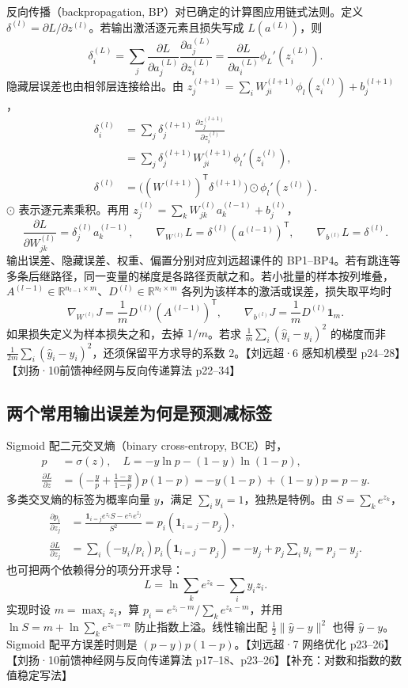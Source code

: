\documentclass[UTF8,a4paper,zihao=-4,fontset=fandol]{ctexrep}
\begin{document}
反向传播（backpropagation, BP）对已确定的计算图应用链式法则。定义 $\delta^{(l)}=\partial L/\partial z^{(l)}$。若输出激活逐元素且损失写成 $L(a^{(L)})$，则
\[
 \delta^{(L)}_i
 =\sum_j\frac{\partial L}{\partial a^{(L)}_j}
       \frac{\partial a^{(L)}_j}{\partial z^{(L)}_i}
 =\frac{\partial L}{\partial a^{(L)}_i}\phi_L'(z^{(L)}_i).
\]
隐藏层误差也由相邻层连接给出。由 $z_j^{(l+1)}=\sum_i W^{(l+1)}_{ji}\phi_l(z^{(l)}_i)+b_j^{(l+1)}$，
\begin{align*}
 \delta^{(l)}_i
 &=\sum_j \delta^{(l+1)}_j\,
    \frac{\partial z_j^{(l+1)}}{\partial z_i^{(l)}}\\
 &=\sum_j \delta^{(l+1)}_j W_{ji}^{(l+1)}\phi_l'(z_i^{(l)}),\\
 \delta^{(l)}
 &=\bigl((W^{(l+1)})^{\mathsf T}\delta^{(l+1)}\bigr)
       \odot\phi_l'(z^{(l)}).
\end{align*}
$\odot$ 表示逐元素乘积。再用 $z^{(l)}_j=\sum_k W^{(l)}_{jk}a_k^{(l-1)}+b_j^{(l)}$，
\[
 \frac{\partial L}{\partial W^{(l)}_{jk}}
 =\delta^{(l)}_j a_k^{(l-1)},\qquad
 \nabla_{W^{(l)}}L=\delta^{(l)}(a^{(l-1)})^{\mathsf T},\qquad
 \nabla_{b^{(l)}}L=\delta^{(l)}.
\]
输出误差、隐藏误差、权重、偏置分别对应刘远超课件的 BP1--BP4。若有跳连等多条后继路径，同一变量的梯度是各路径贡献之和。若小批量的样本按列堆叠，$A^{(l-1)}\in\mathbb R^{n_{l-1}\times m}$、$D^{(l)}\in\mathbb R^{n_l\times m}$ 各列为该样本的激活或误差，损失取平均时
\[
 \nabla_{W^{(l)}}J=\frac1mD^{(l)}(A^{(l-1)})^{\mathsf T},
 \qquad
 \nabla_{b^{(l)}}J=\frac1mD^{(l)}\mathbf 1_m .
\]
如果损失定义为样本损失之和，去掉 $1/m$。若求 $\frac1m\sum_i(\hat y_i-y_i)^2$ 的梯度而非 $\frac1{2m}\sum_i(\hat y_i-y_i)^2$，还须保留平方求导的系数 $2$。【刘远超·6 感知机模型 p24--28】【刘扬·10前馈神经网与反向传递算法 p22--34】

\subsection*{两个常用输出误差为何是预测减标签}

Sigmoid 配二元交叉熵（binary cross-entropy, BCE）时，
\begin{align*}
 p&=\sigma(z),\quad L=-y\ln p-(1-y)\ln(1-p),\\
 \frac{\partial L}{\partial z}
 &=\left(-\frac{y}{p}+\frac{1-y}{1-p}\right)p(1-p)
 =-y(1-p)+(1-y)p=p-y.
\end{align*}
多类交叉熵的标签为概率向量 $y$，满足 $\sum_i y_i=1$，独热是特例。由 $S=\sum_k e^{z_k}$，
\begin{align*}
 \frac{\partial p_i}{\partial z_j}
 &=\frac{\mathbf 1_{i=j}e^{z_i}S-e^{z_i}e^{z_j}}{S^2}
 =p_i(\mathbf 1_{i=j}-p_j),\\
 \frac{\partial L}{\partial z_j}
 &=\sum_i(-y_i/p_i)p_i(\mathbf 1_{i=j}-p_j)
 =-y_j+p_j\sum_i y_i=p_j-y_j.
\end{align*}
也可把两个依赖得分的项分开求导：
\[
 L=\ln \sum_k e^{z_k}-\sum_i y_i z_i.
\]
实现时设 $m=\max_i z_i$，算 $p_i=e^{z_i-m}/\sum_k e^{z_k-m}$，并用 $\ln S=m+\ln\sum_k e^{z_k-m}$ 防止指数上溢。线性输出配 $\tfrac12\|\hat y-y\|^2$ 也得 $\hat y-y$。Sigmoid 配平方误差时则是 $(p-y)p(1-p)$。【刘远超·7 网络优化 p23--26】【刘扬·10前馈神经网与反向传递算法 p17--18、p23--26】【补充：对数和指数的数值稳定写法】
\end{document}
